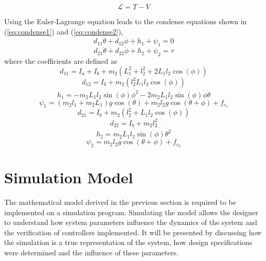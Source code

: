 \begin{equation} \label{eq:euler_lagrane}
\mathcal{L}=T-V
\end{equation}

Using the Euler-Lagrange equation leads to the condense equations shown in (\ref{eq:condense1}) and (\ref{eq:condense2}),
\begin{equation} \label{eq:condense1}
d_{11}\ddot{\theta}+d_{12}\ddot{\phi} + h_{1} + \psi_{1} = 0
\end{equation}
\begin{equation} \label{eq:condense2}
d_{21}\ddot{\theta} + d_{22}\ddot{\phi} + h_{2} + \psi_{2} = \tau
\end{equation}
where the coefficients are defined as
\begin{equation} \label{eq:d11}
d_{11} = I_{a} + I_{b} + m_{2}(L_{1}^2 + l_{2}^2+2L_{1}l_{2}\cos(\phi))
\end{equation}
\begin{equation} \label{eq:d12}
d_{12} = I_{b} +m_{2}(l_{2}^2 L_{1}l_{2}\cos(\phi))
\end{equation}
\begin{equation} \label{eq:h1}
h_{1} = -m_{2}L_{1}l_{2}\sin(\phi)\dot{\phi^2}-2m_{2}L_{1}l_{2}\sin(\phi)\dot{\phi}\dot{\theta}
\end{equation}
\begin{equation} \label{eq:psi1}
\psi_{1} = (m_{2}l_{1}+m_{2}L_{1})g\cos(\theta) + m_{2}l_{2}g\cos(\theta+\phi) + f_{c_{1}}
\end{equation}
\begin{equation} \label{eq:d21}
d_{21}= I_{b}+m_{2}(l_{2}^2+L_{1}l_{2}\cos(\phi))
\end{equation}
\begin{equation} \label{eq:d22}
d_{22}= I_{b}+ m_{2}l_{2}^2
\end{equation}
\begin{equation} \label{eq:h2}
h_{2}= m_{2}L_{1}l_{2}\sin(\phi)\dot{\theta^2}
\end{equation}
\begin{equation} \label{eq:psi2}
\psi_{2}= m_{2}l_{2}g\cos(\theta+\phi) + f_{c_{2}}
\end{equation}

\section{Simulation Model}
The mathematical model derived in the previous section is required to be implemented on a simulation program. Simulating the model allows the designer to understand how system parameters influence the dynamics of the system and the verification of controllers implemented. It will be presented by discussing how the simulation is a true representation of the system, how design specifications were determined and the influence of these parameters.\\


